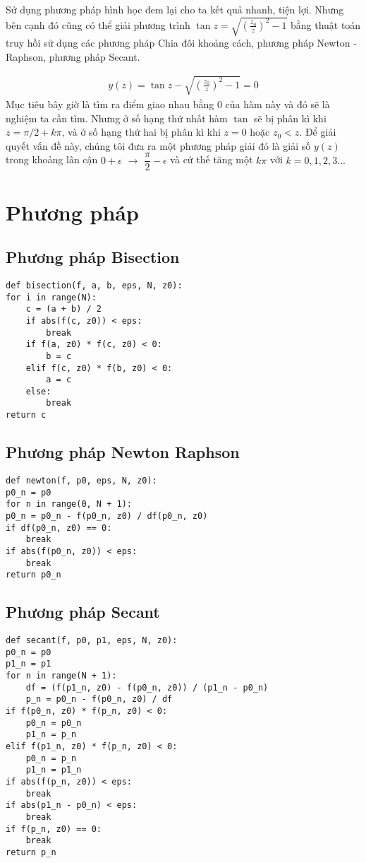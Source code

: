 \documentclass{article}
\begin{document}
	Sử dụng phương pháp hình học đem lại cho ta kết quả nhanh, tiện lợi. Nhưng bên cạnh đó cũng có thể giải phương trình $\tan z = \sqrt{\left( \frac{z_0}{z} \right)^2 - 1}$ bằng thuật toán truy hồi sử dụng các phương pháp Chia đôi khoảng cách, phương pháp Newton - Raphson, phương pháp Secant.
	
	\begin{align}
		y(z) = \tan z - \sqrt{\left( \frac{z_0}{z} \right)^2 - 1} = 0
	\end{align}
	Mục tiêu bây giờ là tìm ra điểm giao nhau bằng 0 của hàm này và đó sẽ là nghiệm ta cần tìm. Nhưng ở số hạng thứ nhất hàm $\tan$ sẽ bị phân kì khi $z = \pi/2 + k \pi$, và ở số hạng thứ hai bị phân kì khi $z = 0$ hoặc $z_0 < z$. Để giải quyết vấn đề này, chúng tôi đưa ra một phương pháp giải đó là giải số $y(z)$ trong khoảng lân cận $0+ \epsilon$ $\rightarrow $ $\dfrac{\pi}{2} - \epsilon$ và cứ thế tăng một $k\pi$ với $k = 0,1,2,3...$
	
	\newpage
	\section{Phương pháp}
	\subsection{Phương pháp Bisection}
	\begin{verbatim}
def bisection(f, a, b, eps, N, z0):
for i in range(N):
	c = (a + b) / 2
	if abs(f(c, z0)) < eps:
		break
	if f(a, z0) * f(c, z0) < 0:
		b = c
	elif f(c, z0) * f(b, z0) < 0:
		a = c
	else:
		break
return c
	\end{verbatim}
	\subsection{Phương pháp Newton Raphson}
	\begin{verbatim}
def newton(f, p0, eps, N, z0):
p0_n = p0
for n in range(0, N + 1):
p0_n = p0_n - f(p0_n, z0) / df(p0_n, z0)
if df(p0_n, z0) == 0:
	break
if abs(f(p0_n, z0)) < eps:
	break
return p0_n
	\end{verbatim}
	\subsection{Phương pháp Secant}
	\begin{verbatim}
def secant(f, p0, p1, eps, N, z0):
p0_n = p0
p1_n = p1
for n in range(N + 1):
	df = (f(p1_n, z0) - f(p0_n, z0)) / (p1_n - p0_n)
	p_n = p0_n - f(p0_n, z0) / df
if f(p0_n, z0) * f(p_n, z0) < 0:
	p0_n = p0_n
	p1_n = p_n
elif f(p1_n, z0) * f(p_n, z0) < 0:
	p0_n = p_n
	p1_n = p1_n
if abs(f(p_n, z0)) < eps:
	break
if abs(p1_n - p0_n) < eps:
	break
if f(p_n, z0) == 0:
	break
return p_n
	\end{verbatim}
\end{document}
